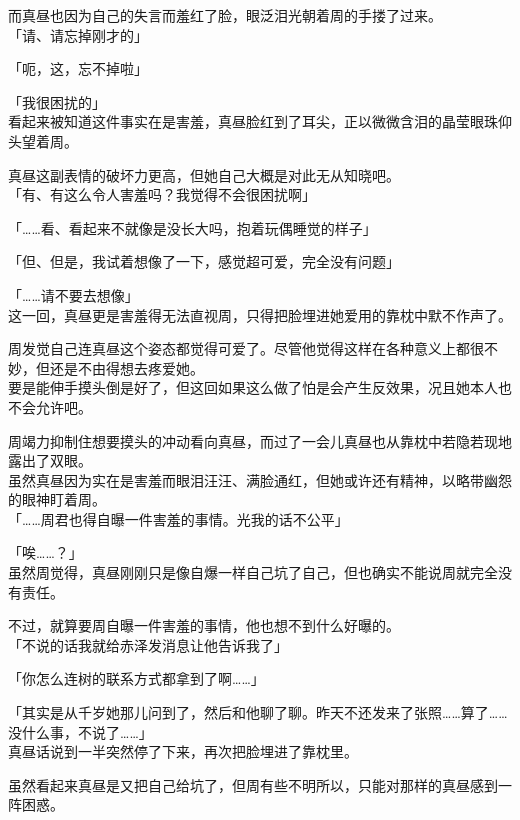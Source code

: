 而真昼也因为自己的失言而羞红了脸，眼泛泪光朝着周的手搂了过来。\\

「请、请忘掉刚才的」

「呃，这，忘不掉啦」

「我很困扰的」\\

看起来被知道这件事实在是害羞，真昼脸红到了耳尖，正以微微含泪的晶莹眼珠仰头望着周。

真昼这副表情的破坏力更高，但她自己大概是对此无从知晓吧。\\

「有、有这么令人害羞吗？我觉得不会很困扰啊」

「……看、看起来不就像是没长大吗，抱着玩偶睡觉的样子」

「但、但是，我试着想像了一下，感觉超可爱，完全没有问题」

「……请不要去想像」\\

这一回，真昼更是害羞得无法直视周，只得把脸埋进她爱用的靠枕中默不作声了。

周发觉自己连真昼这个姿态都觉得可爱了。尽管他觉得这样在各种意义上都很不妙，但还是不由得想去疼爱她。\\

要是能伸手摸头倒是好了，但这回如果这么做了怕是会产生反效果，况且她本人也不会允许吧。

周竭力抑制住想要摸头的冲动看向真昼，而过了一会儿真昼也从靠枕中若隐若现地露出了双眼。\\

虽然真昼因为实在是害羞而眼泪汪汪、满脸通红，但她或许还有精神，以略带幽怨的眼神盯着周。\\

「……周君也得自曝一件害羞的事情。光我的话不公平」

「唉……？」\\

虽然周觉得，真昼刚刚只是像自爆一样自己坑了自己，但也确实不能说周就完全没有责任。

不过，就算要周自曝一件害羞的事情，他也想不到什么好曝的。\\

「不说的话我就给赤泽发消息让他告诉我了」

「你怎么连树的联系方式都拿到了啊……」

「其实是从千岁她那儿问到了，然后和他聊了聊。昨天不还发来了张照……算了……没什么事，不说了……」\\

真昼话说到一半突然停了下来，再次把脸埋进了靠枕里。

虽然看起来真昼是又把自己给坑了，但周有些不明所以，只能对那样的真昼感到一阵困惑。
